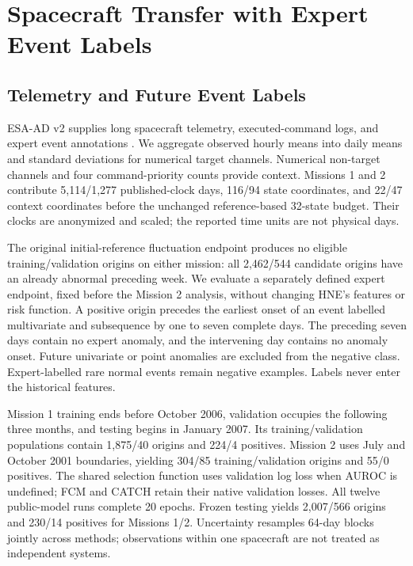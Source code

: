 \section{Spacecraft Transfer with Expert Event Labels}
\label{app:esa}

\subsection{Telemetry and Future Event Labels}
ESA-AD v2 supplies long spacecraft telemetry, executed-command logs, and expert event annotations \citep{hneD09,esaADv2}. We aggregate observed hourly means into daily means and standard deviations for numerical target channels. Numerical non-target channels and four command-priority counts provide context. Missions 1 and 2 contribute 5,114/1,277 published-clock days, 116/94 state coordinates, and 22/47 context coordinates before the unchanged reference-based 32-state budget. Their clocks are anonymized and scaled; the reported time units are not physical days.

The original initial-reference fluctuation endpoint produces no eligible training/validation origins on either mission: all 2,462/544 candidate origins have an already abnormal preceding week. We evaluate a separately defined expert endpoint, fixed before the Mission 2 analysis, without changing HNE's features or risk function. A positive origin precedes the earliest onset of an event labelled multivariate and subsequence by one to seven complete days. The preceding seven days contain no expert anomaly, and the intervening day contains no anomaly onset. Future univariate or point anomalies are excluded from the negative class. Expert-labelled rare normal events remain negative examples. Labels never enter the historical features.

Mission 1 training ends before October 2006, validation occupies the following three months, and testing begins in January 2007. Its training/validation populations contain 1,875/40 origins and 224/4 positives. Mission 2 uses July and October 2001 boundaries, yielding 304/85 training/validation origins and 55/0 positives. The shared selection function uses validation log loss when AUROC is undefined; FCM and CATCH retain their native validation losses. All twelve public-model runs complete 20 epochs. Frozen testing yields 2,007/566 origins and 230/14 positives for Missions 1/2. Uncertainty resamples 64-day blocks jointly across methods; observations within one spacecraft are not treated as independent systems.

